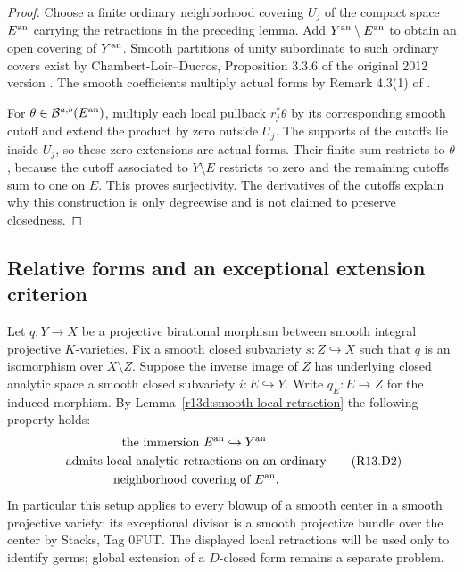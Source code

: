 \begin{proof}
Choose a finite ordinary neighborhood covering $U_j$ of the compact
space $E^{\rm an}$ carrying the retractions in the preceding lemma.
Add $Y^{\rm an}\setminus E^{\rm an}$ to obtain an open covering of
$Y^{\rm an}$.  Smooth partitions of unity subordinate to such
ordinary covers exist by Chambert-Loir--Ducros, Proposition 3.3.6
of the original 2012 version \cite{CLDold}.
The smooth coefficients multiply actual forms by Remark 4.3(1)
of \cite{M}.

For $\theta\in\mathcal B^{a,b}(E^{\rm an})$, multiply each local
pullback $r_j^*\theta$ by its corresponding smooth cutoff and
extend the product by zero outside $U_j$.  The supports of the
cutoffs lie inside $U_j$, so these zero extensions are actual
forms.  Their finite sum restricts to $\theta$, because the
cutoff associated to $Y\setminus E$ restricts to zero and the
remaining cutoffs sum to one on $E$.  This proves surjectivity.
The derivatives of the cutoffs explain why this construction is
only degreewise and is not claimed to preserve closedness.
\end{proof}

\subsection{Relative forms and an exceptional extension criterion}

Let $q:Y\to X$ be a projective birational morphism between smooth
integral projective $K$-varieties.  Fix a smooth closed subvariety
$s:Z\hookrightarrow X$ such that $q$ is an isomorphism over
$X\setminus Z$.  Suppose the inverse image of $Z$ has underlying
closed analytic space a smooth closed subvariety $i:E\hookrightarrow Y$.
Write $q_E:E\to Z$ for the induced morphism.  By
Lemma~\ref{r13d:smooth-local-retraction} the following property holds:
\[
 \begin{gathered}
 \text{the immersion }E^{\rm an}\hookrightarrow Y^{\rm an}
 \\
 \text{ admits local analytic retractions on an ordinary}
 \\
 \text{ neighborhood covering of }E^{\rm an}.
 \end{gathered}
\tag{R13.D2}\label{r13d:local-retractions}
\]
In particular this setup applies to every blowup of a smooth center
in a smooth projective variety: its exceptional divisor is a smooth
projective bundle over the center by Stacks, Tag 0FUT.
The displayed local retractions will be used only to identify germs;
global extension of a $D$-closed form remains a separate problem.

